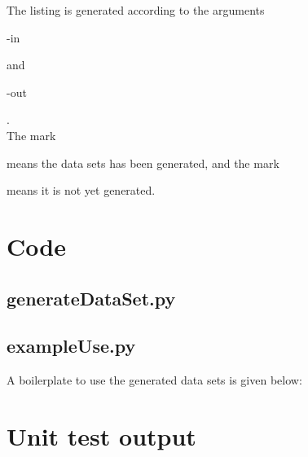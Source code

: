The listing is generated according to the arguments \begin{ttfamily}-in\end{ttfamily} and \begin{ttfamily}-out\end{ttfamily}.\\

The mark \begin{ttfamily}[*]\end{ttfamily} means the data sets has been generated, and the mark \begin{ttfamily}[ ]\end{ttfamily} means it is not yet generated.

\section{Code}

\subsection{generateDataSet.py}

\begin{scriptsize}
\begin{ttfamily}

\end{ttfamily}
\end{scriptsize}

\subsection{exampleUse.py}

A boilerplate to use the generated data sets is given below:
 
\begin{scriptsize}
\begin{ttfamily}

\end{ttfamily}
\end{scriptsize}

\section{Unit test output}

\begin{scriptsize}
\begin{ttfamily}

\end{ttfamily}
\end{scriptsize}

